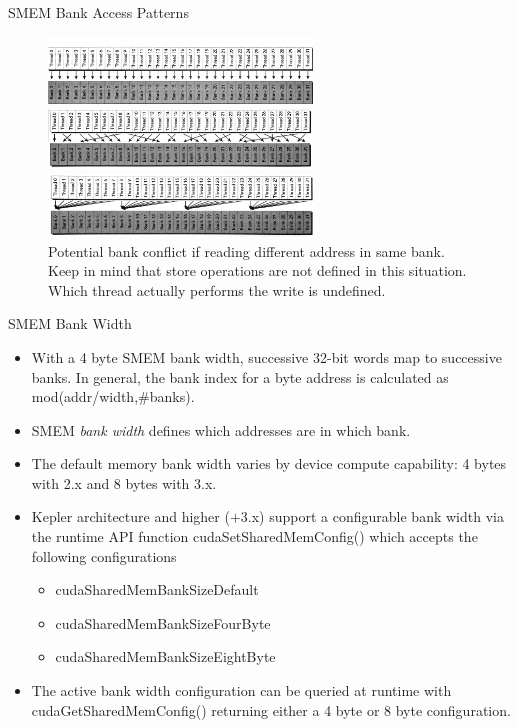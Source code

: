 \documentclass[handout]{beamer}
\begin{document}
\begin{frame}{SMEM Bank Access Patterns}
\begin{figure}
\begin{center}
\includegraphics[width=7cm]{../media/smemaccess3.pdf}
\caption{No bank conflicts, single memory transaction}
\includegraphics[width=7cm]{../media/smemaccess2.pdf}
\caption{Random but, no bank conflicts, single transaction.}
\includegraphics[width=7cm]{../media/smemaccess1.pdf}
\caption{Potential bank conflict if reading different address in same bank. Keep in mind that store operations are not defined in this situation.  Which thread actually performs the write is undefined. }
\end{center}
\end{figure}
\end{frame}

\begin{frame}{SMEM Bank Width}
\begin{itemize}
	\item<1->With a 4 byte SMEM bank width, successive 32-bit words map to successive banks.  In general, the bank index for a byte address is calculated as mod(addr/width,\#banks).
	\item<1->SMEM \emph{bank width} defines which addresses are in which bank.
	\item<1->The default memory bank width varies by device compute capability: 4 bytes with 2.x and 8 bytes with 3.x.  
	\item<1->Kepler architecture and higher ($+$3.x) support a configurable bank width via the runtime API function {\selectfont cudaSetSharedMemConfig()} which accepts the following configurations
	\begin{itemize}
		\item<1->{\selectfont cudaSharedMemBankSizeDefault}
		\item<1->{\selectfont cudaSharedMemBankSizeFourByte}
		\item<1->{\selectfont cudaSharedMemBankSizeEightByte}
	\end{itemize}
	\item<1->The active bank width configuration can be queried at runtime with {\selectfont cudaGetSharedMemConfig()} returning either a 4 byte or 8 byte configuration.  
\end{itemize}
\end{frame}
\end{document}
